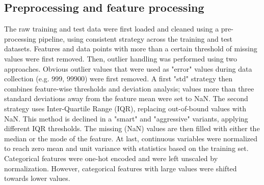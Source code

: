 \documentclass[10pt,conference,compsocconf]{IEEEtran}
\begin{document}
\subsection{Preprocessing and feature processing}
The raw training and test data were first loaded and cleaned using a pre-processing pipeline, using consistent strategy across the training and test datasets. 
Features and data points with more than a certain threshold of missing values were first removed.
Then, outlier handling was performed using two approaches. Obvious outlier values that were used as "error" values during data collection (e.g. 999, 99900) were first removed. A first "std" strategy then combines feature-wise thresholds and deviation analysis; values more than three standard deviations away from the feature mean were set to NaN. The second strategy uses Inter-Quartile Range (IQR), replacing out-of-bound values with NaN. This method is declined in a "smart" and "aggressive" variants, applying different IQR thresholds. The missing (NaN) values are then filled with either the median or the mode of the feature. 
At last, continuous variables were normalized to reach zero mean and unit variance with statistics based on the training set. Categorical features were one-hot encoded and were left unscaled by normalization. However, categorical features with large values were shifted towards lower values. 
\end{document}

